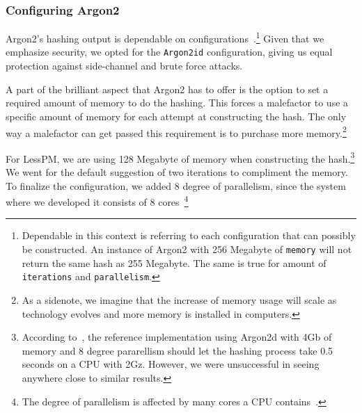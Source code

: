 \subsubsection{Configuring Argon2}
Argon2's hashing output is dependable on configurations~\cite{argon2specs}.\footnote{
  Dependable in this context is referring to each configuration that can
  possibly be constructed.
  An instance of Argon2 with 256 Megabyte of \texttt{memory} will not return the
  same hash as 255 Megabyte.
  The same is true for amount of \texttt{iterations} and \texttt{parallelism}.
}
Given that we emphasize security, we opted for the \texttt{Argon2id}
configuration, giving us equal protection against side-channel and brute
force attacks.

A part of the brilliant aspect that Argon2 has to offer is the option to set
a required amount of memory to do the hashing.
This forces a malefactor to use a specific amount of memory for each attempt
at constructing the hash.
The only way a malefactor can get passed this requirement is to purchase more
memory.\footnote{
  As a sidenote, we imagine that the increase of memory usage will scale as
  technology evolves and more memory is installed in computers.
}

For LessPM, we are using 128 Megabyte of memory when constructing the hash.\footnote{
  According to~\cite{argon2specs}, the reference implementation using Argon2d
  with 4Gb of memory and 8 degree pararellism should let the hashing process
  take 0.5 seconds on a CPU with 2Gz. However, we were unsuccessful in seeing
  anywhere close to similar results.
}
We went for the default suggestion of two iterations to compliment the memory.
To finalize the configuration, we added 8 degree of parallelism, since the
system where we developed it consists of 8 cores~\footnote{
  The degree of parallelism is affected by many cores a CPU
  contains~\cite{argon2specs}.
}


